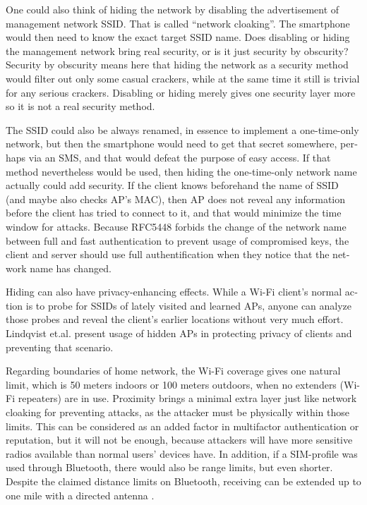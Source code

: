 \documentclass[12pt,a4paper,english]{tutthesis}
\begin{document}
\begin{otherlanguage}{english}
\label{tag:hidessid}
One could also think of hiding the network by disabling the
advertisement of manage\-ment network SSID. That is called ``network
cloaking''. The smartphone would then need to know the exact target SSID name.
Does disabling or hiding the management network bring real security, or
is it just security by obscurity?  Security by obscurity means here
that hiding the network 
as a security method would filter out only some casual crackers, while
at the same time it still is trivial for any serious crackers.
Disabling or hiding  merely gives one security layer more so it is not
a real security method.

The SSID could also be always renamed, in essence to implement
a one-time-only network, but then the smartphone would need to get that
secret somewhere, perhaps via an SMS, and that would defeat the purpose
of easy access.  If that method nevertheless would be used, then
hiding the one-time-only network name actually could add security. 
If the client knows beforehand the name of SSID
(and maybe also checks AP's MAC), then AP does not reveal any information
before the client has tried to connect to it, and that would minimize
the time window for attacks. 
Because RFC5448 \cite[p.12]{rfc5448} forbids the change of the network name between full and
fast authentication to prevent usage of compromised keys, the client
and server should use full authentification when they notice that
the network name has changed.




 Hiding can also have privacy-enhancing effects.
While a Wi-Fi client's normal action is to probe for SSIDs of lately visited
and learned APs, anyone can analyze those probes and reveal the client's
earlier locations without very much effort.
Lindqvist et.al. \cite{hidden-wlan} present usage of hidden
APs in protecting privacy of clients and preventing that scenario.



Regarding boundaries of home network, the Wi-Fi coverage gives 
one natural limit, which is 50 meters indoors or 100 meters outdoors,
when no extenders (Wi-Fi repeaters) are in use.
Proximity brings a minimal extra layer just like network cloaking 
for preventing attacks, as the attacker must be physically within
those limits.
This can be considered as an added factor in multifactor
authentication or reputation, but it will not be enough, because
attackers will have more sensitive  radios available than normal users'
devices have. 
In addition, if a SIM-profile was used through Bluetooth, there would
also be
range limits, but even shorter. Despite the claimed distance limits
on Bluetooth, receiving can be extended up to one mile with
a directed antenna \cite{SANS-bluetooth-2007}.





\end{otherlanguage}
\end{document}
